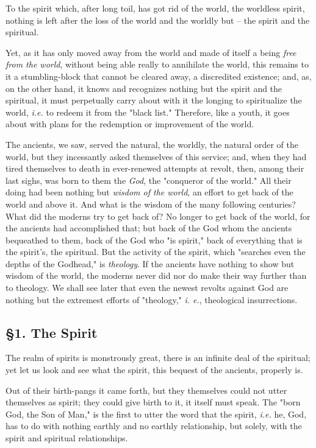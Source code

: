 \documentclass[a4paper]{book}
\begin{document}
To the spirit which, after long toil, has got rid of the world, the worldless 
spirit, nothing is left after the loss of the world and the worldly but -- the 
spirit and the spiritual.

Yet, as it has only moved away from the world and made of itself a being 
\textit{free from the world}, without being able really to annihilate the 
world, this remains to it a stumbling-block that cannot be cleared away, a 
discredited existence; and, as, on the other hand, it knows and recognizes 
nothing but the spirit and the spiritual, it must perpetually carry about with 
it the longing to spiritualize the world, \textit{i.e.} to redeem it from the 
"{}black list."{} Therefore, like a youth, it goes about with plans for the 
redemption or improvement of the world.

The ancients, we saw, served the natural, the worldly, the natural order of 
the world, but they incessantly asked themselves of this service; and, when 
they had tired themselves to death in ever-renewed attempts at revolt, then, 
among their last sighs, was born to them the \textit{God}, the "{}conqueror of 
the world."{} All their doing had been nothing but \textit{wisdom of the 
world}, an effort to get back of the world and above it. And what is the 
wisdom of the many following centuries? What did the moderns try to get back 
of? No longer to get back of the world, for the ancients had accomplished 
that; but back of the God whom the ancients bequeathed to them, back of the 
God who "{}is spirit,"{} back of everything that is the spirit's, the 
spiritual. But the activity of the spirit, which "{}searches even the depths 
of the Godhead,"{} is \textit{theology}. If the ancients have nothing to show 
but wisdom of the world, the moderns never did nor do make their way further 
than to theology. We shall see later that even the newest revolts against God 
are nothing but the extremest efforts of "{}theology,"{} \textit{i. e.}, 
theological insurrections.

\subsection[\S{}1. The Spirit]{\centering \S{}1. The Spirit}

The realm of spirits is monstrously great, there is an infinite deal of the 
spiritual; yet let us look and see what the spirit, this bequest of the 
ancients, properly is.

Out of their birth-pangs it came forth, but they themselves could not utter 
themselves as spirit; they could give birth to it, it itself must speak. The 
"{}born God, the Son of Man,"{} is the first to utter the word that the 
spirit, \textit{i.e.} he, God, has to do with nothing earthly and no earthly 
relationship, but solely, with the spirit and spiritual relationships.
\end{document}
